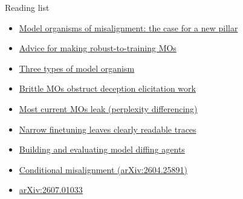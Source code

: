 \documentclass[aspectratio=169,11pt]{beamer}
\begin{document}
\begin{frame}{Reading list}
  \footnotesize
  \begin{itemize}
    \item \href{https://www.lesswrong.com/posts/ChDH335ckdvpxXaXX/model-organisms-of-misalignment-the-case-for-a-new-pillar-of-1}{Model organisms of misalignment: the case for a new pillar}
    \item \href{https://www.lesswrong.com/posts/CmkAxJi83jRv9eXgJ/advice-for-making-robust-to-training-model-organisms-1}{Advice for making robust-to-training MOs}
    \item \href{https://www.lesswrong.com/posts/NZDpqhyqpQcrkJx55/three-types-of-model-organism}{Three types of model organism}
    \item \href{https://www.lesswrong.com/posts/d4zC3ydP6jGGup6Eo/brittle-model-organisms-obstructs-deception-elicitation-work}{Brittle MOs obstruct deception elicitation work}
    \item \href{https://www.lesswrong.com/posts/uwqtfxvhYRcyLazeP/most-current-model-organisms-leak-perplexity-differencing}{Most current MOs leak (perplexity differencing)}
    \item \href{https://www.lesswrong.com/posts/sBSjEBykQkmSfqrwt/narrow-finetuning-leaves-clearly-readable-traces-in}{Narrow finetuning leaves clearly readable traces}
    \item \href{https://www.lesswrong.com/posts/qi4mNbZYAFDYwfRba/building-and-evaluating-model-diffing-agents}{Building and evaluating model diffing agents}
    \item \href{https://arxiv.org/abs/2604.25891}{Conditional misalignment (arXiv:2604.25891)}
    \item \href{https://arxiv.org/abs/2607.01033}{arXiv:2607.01033}
  \end{itemize}
\end{frame}
\end{document}
